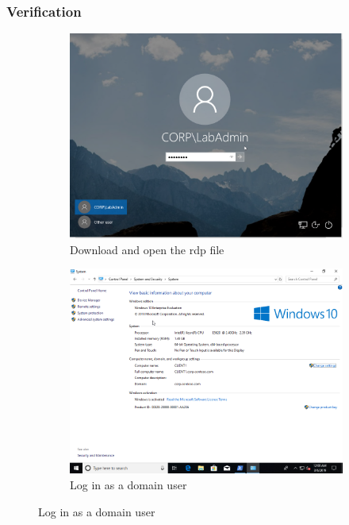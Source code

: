 \subsubsection{Verification}
\begin{figure}[h]
	\begin{subfigure}{0.5\textwidth}
		\captionsetup{width=0.8\linewidth}
		\includegraphics[width=0.9\linewidth]{img/Methodologie/Verification4.png}
		\centering
		\caption{Download and open the \acrshort{rdp} file}
	\end{subfigure}
	\begin{subfigure}{0.5\textwidth}
		\captionsetup{width=0.8\linewidth}
		\includegraphics[width=0.9\linewidth]{img/Methodologie/Verification5.png} 
		\centering
		\caption{Log in as a domain user}
	\end{subfigure}
\end{figure}
